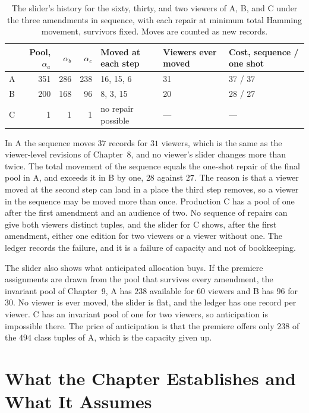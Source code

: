 \documentclass[11pt,twoside,openright]{book}
\theoremstyle{plain}
\theoremstyle{definition}
\theoremstyle{remark}
\begin{document}
\begin{table}[ht]
\centering
\begin{tabular}{@{}lrrrp{2.2cm}p{1.6cm}p{2.2cm}@{}}
\toprule
 & Pool, $\alpha_a$ & $\alpha_b$ & $\alpha_c$ & Moved at each step & Viewers ever moved & Cost, sequence / one shot\\
\midrule
A & 351 & 286 & 238 & 16, 15, 6 & 31 & 37 / 37\\
B & 200 & 168 & 96 & 8, 3, 15 & 20 & 28 / 27\\
C & 1 & 1 & 1 & no repair possible & --- & ---\\
\bottomrule
\end{tabular}
\caption{The slider's history for the sixty, thirty, and two viewers of A, B, and C under the three amendments in sequence, with each repair at minimum total Hamming movement, survivors fixed. Moves are counted as new records.}\label{tab:slider12}
\end{table}

In A the sequence moves $37$ records for $31$ viewers, which is the same as the viewer-level revisions of Chapter~8, and no viewer's slider changes more than twice. The total movement of the sequence equals the one-shot repair of the final pool in A, and exceeds it in B by one, $28$ against $27$. The reason is that a viewer moved at the second step can land in a place the third step removes, so a viewer in the sequence may be moved more than once. Production C has a pool of one after the first amendment and an audience of two. No sequence of repairs can give both viewers distinct tuples, and the slider for C shows, after the first amendment, either one edition for two viewers or a viewer without one. The ledger records the failure, and it is a failure of capacity and not of bookkeeping.

The slider also shows what anticipated allocation buys. If the premiere assignments are drawn from the pool that survives every amendment, the invariant pool of Chapter~9, A has $238$ available for $60$ viewers and B has $96$ for $30$. No viewer is ever moved, the slider is flat, and the ledger has one record per viewer. C has an invariant pool of one for two viewers, so anticipation is impossible there. The price of anticipation is that the premiere offers only $238$ of the $494$ class tuples of A, which is the capacity given up.

\section{What the Chapter Establishes and What It Assumes}\label{sec:limits12}
\end{document}
